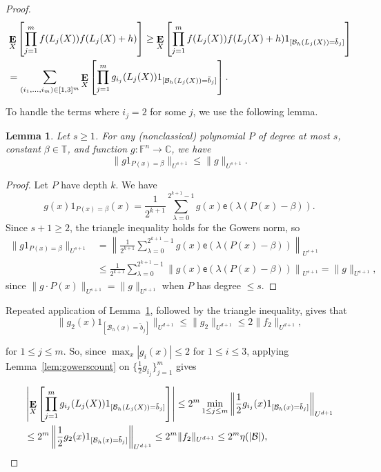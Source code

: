 \documentclass{article}
\theoremstyle{plain}
\newtheorem{lem}[theorem]{Lemma}
\theoremstyle{definition}
\theoremstyle{definition}
\theoremstyle{remark}
\numberwithin{equation}{section}
\newcommand{\CC}{\mathbb{C}}
\newcommand{\FF}{\mathbb{F}}
\newcommand{\TT}{\mathbb{T}}
\newcommand{\Esymb}{{\bf E}}
\DeclareMathOperator*{\E}{\Esymb}
\newcommand{\cB}{\mathcal B}
\newcommand{\expo}[1]{{\mathsf{e}\left(#1\right)}}
\begin{document}
\begin{proof}
\begin{align*}
    & \E_{X}\left[ \prod_{j=1}^m f(L_j(X))f(L_j(X)+h)\right]\geq \E_{X}\left[ \prod_{j=1}^m f(L_j(X))f(L_j(X)+h) 1_{[\cB_h(L_j(X))=\tilde b_j]}\right]\\
    &= \sum_{(i_1,\dots,i_m)\in [1,3]^m}\E_X \left[ \prod_{j=1}^m g_{i_j}(L_j(X)) 1_{[\cB_h(L_j(X))=\tilde b_j]} \right].
\end{align*}

To handle the terms where $i_j=2$ for some $j$, we use the following lemma.

\begin{lem}
\label{lem:gowerspoly}
Let $s\geq 1$. For any (nonclassical) polynomial $P$ of degree at most $s$, constant $\beta \in \TT$, and function $g:\FF^n \rightarrow \CC$, we have
\[\|g1_{P(x)=\beta}\|_{U^{s+1}}\leq \|g\|_{U^{s+1}}.\]
\end{lem}

\begin{proof}
Let $P$ have depth $k$. We have
\[g(x)1_{P(x)=\beta}(x)=\frac{1}{2^{k+1}}\sum_{\lambda=0}^{2^{k+1}-1}g(x)\expo{\lambda(P(x)-\beta)}.\]
Since $s+1\geq 2$, the triangle inequality holds for the Gowers norm, so
\begin{align*}
    \|g1_{P(x)=\beta}\|_{U^{s+1}}&=\left\|\frac{1}{2^{k+1}}\sum_{\lambda=0}^{2^{k+1}-1}g(x)\expo{\lambda(P(x)-\beta)}\right\|_{U^{s+1}} \\
    &\leq \frac{1}{2^{k+1}}\sum_{\lambda=0}^{2^{k+1}-1}\left\|g(x)\expo{\lambda(P(x)-\beta)}\right\|_{U^{s+1}}= \|g\|_{U^{s+1}},
\end{align*}
since $\|g\cdot P(x)\|_{U^{s+1}}=\|g\|_{U^{s+1}}$ when $P$ has degree $\leq s$.
\end{proof}

Repeated application of Lemma~\ref{lem:gowerspoly}, followed by the triangle inequality, gives that
\[\|g_2(x) 1_{[\cB_h(x)=\tilde b_j]}\|_{U^{d+1}}\leq \|g_2\|_{U^{d+1}}\leq 2\|f_2\|_{U^{d+1}},\]

\noindent for $1\leq j\leq m$. So, since $\max_x |g_i(x)|\leq 2$ for $1\leq i\leq 3$, applying Lemma~\ref{lem:gowerscount} on $\{\frac{1}{2}g_{i_j}\}_{j=1}^m$ gives

\begin{align*}
    & \left|\E_{X}\left[\prod_{j=1}^m g_{i_j}(L_j(X))1_{[\cB_h(L_j(X))=\tilde b_j]}\right]\right|\leq 2^m \min_{1\leq j\leq m} \left\|\frac{1}{2} g_{i_j}(x)1_{[\cB_h(x)=\tilde b_j]}\right\|_{U^{d+1}} \\
    & \leq 2^m \left\|\frac{1}{2}  g_2(x)1_{[\cB_h(x)=\tilde b_j]}\right\|_{U^{d+1}}\leq 2^{m} \|f_2\|_{U^{d+1}} \leq 2^{m} \eta(|\cB|),
\end{align*}


\end{proof}
\end{document}

